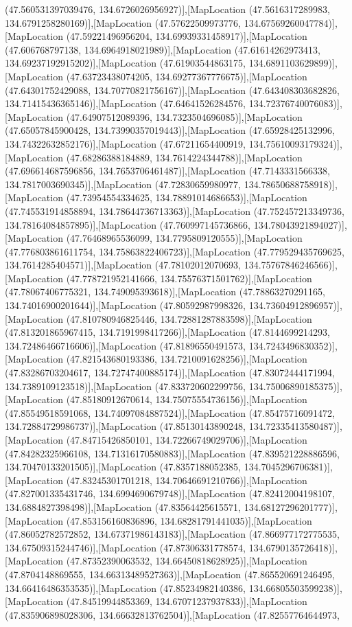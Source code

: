 (47.560531397039476, 134.6726026956927)],[MapLocation (47.5616317289983, 134.6791258280169)],[MapLocation (47.57622509973776, 134.67569260047784)],[MapLocation (47.59221496956204, 134.69939331458917)],[MapLocation (47.606768797138, 134.6964918021989)],[MapLocation (47.61614262973413, 134.69237192915202)],[MapLocation (47.61903544863175, 134.6891103629899)],[MapLocation (47.63723438074205, 134.69277367776675)],[MapLocation (47.64301752429088, 134.70770821756167)],[MapLocation (47.643408303682826, 134.71415436365146)],[MapLocation (47.64641526284576, 134.72376740076083)],[MapLocation (47.64907512089396, 134.7323504696085)],[MapLocation (47.65057845900428, 134.73990357019443)],[MapLocation (47.65928425132996, 134.74322632852176)],[MapLocation (47.67211654400919, 134.75610093179324)],[MapLocation (47.68286388184889, 134.7614224344788)],[MapLocation (47.696614687596856, 134.7653706461487)],[MapLocation (47.7143331566338, 134.7817003690345)],[MapLocation (47.72830659980977, 134.78650688758918)],[MapLocation (47.73954554334625, 134.78891014686653)],[MapLocation (47.745531914858894, 134.78644736713363)],[MapLocation (47.752457213349736, 134.78164084857895)],[MapLocation (47.760997145736866, 134.78043921894027)],[MapLocation (47.76468965536099, 134.7795809120555)],[MapLocation (47.776803861611754, 134.75863822406723)],[MapLocation (47.779529435769625, 134.7614285404571)],[MapLocation (47.78102012070693, 134.75767846246566)],[MapLocation (47.778721952141666, 134.75576371501762)],[MapLocation (47.78067406775321, 134.749095393618)],[MapLocation (47.78863270291165, 134.74016900201644)],[MapLocation (47.80592987998326, 134.73604912896957)],[MapLocation (47.810780946825446, 134.72881287883598)],[MapLocation (47.813201865967415, 134.7191998417266)],[MapLocation (47.8144699214293, 134.72486466716606)],[MapLocation (47.81896550491573, 134.7243496830352)],[MapLocation (47.821543680193386, 134.7210091628256)],[MapLocation (47.83286703204617, 134.72747400885174)],[MapLocation (47.83072444171994, 134.7389109123518)],[MapLocation (47.833720602299756, 134.75006890185375)],[MapLocation (47.85180912670614, 134.75075554736156)],[MapLocation (47.85549518591068, 134.74097084887524)],[MapLocation (47.85475716091472, 134.72884729986737)],[MapLocation (47.85130143890248, 134.72335413580487)],[MapLocation (47.84715426850101, 134.72266749029706)],[MapLocation (47.84282325966108, 134.71316170580883)],[MapLocation (47.839521228886596, 134.70470133201505)],[MapLocation (47.8357188052385, 134.7045296706381)],[MapLocation (47.83245301701218, 134.70646691210766)],[MapLocation (47.827001335431746, 134.6994690679748)],[MapLocation (47.82412004198107, 134.6884827398498)],[MapLocation (47.83564425615571, 134.68127296201777)],[MapLocation (47.853156160836896, 134.68281791441035)],[MapLocation (47.86052782572852, 134.67371986143183)],[MapLocation (47.866977172775535, 134.67509315244746)],[MapLocation (47.87306331778574, 134.6790135726418)],[MapLocation (47.87352390063532, 134.66450818628925)],[MapLocation (47.8704148869555, 134.66313489527363)],[MapLocation (47.865520691246495, 134.66416486353535)],[MapLocation (47.85234982140386, 134.66805503599238)],[MapLocation (47.84519944853369, 134.67071237937833)],[MapLocation (47.835906898028306, 134.66632813762504)],[MapLocation (47.82557764644973, 